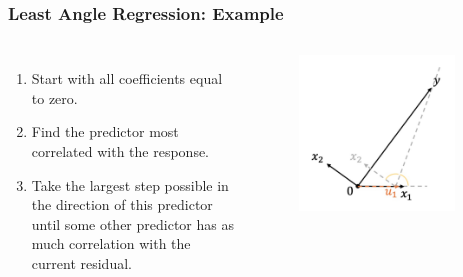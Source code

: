 \begin{frame}
\frametitle{Least Angle Regression: Example}
\begin{columns}[t]
    \begin{enumerate}
        \item Start with all coefficients equal to zero.
        \item Find the predictor most correlated with the response.
        \item Take the largest step possible in the direction of this predictor until some other predictor has as much correlation with the current residual.
    \end{enumerate}
    
    \begin{figure}[!htbp]
        \begin{center}
            \includegraphics[width=0.9\textwidth]{img/LAR/3.jpeg}
        \end{center}
    \end{figure}
\end{columns}
\end{frame}

